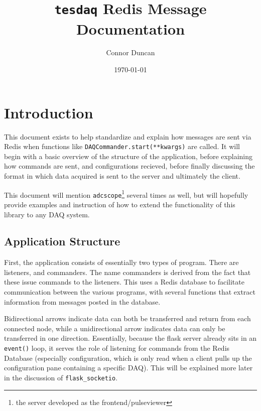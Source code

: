 \documentclass{article}
\author{Connor Duncan}
\date{\today}
\title{\texttt{tesdaq} Redis Message Documentation}
\begin{document}
\maketitle
\tableofcontents

\section{Introduction}
This document exists to help standardize and explain how messages are sent via Redis when functions like \texttt{DAQCommander.start(**kwargs)} are called. It will begin with a basic overview of the structure of the application, before explaining how commands are sent, and configurations recieved, before finally discussing the format in which data acquired is sent to the server and ultimately the client.

This document will mention \texttt{adcscope}\footnote{the server developed as the frontend/pulseviewer} several times as well, but will hopefully provide examples and instruction of how to extend the functionality of this library to any DAQ system.
\subsection{Application Structure}
First, the application consists of essentially two types of program. There are listeners, and commanders. The name commanders is derived from the fact that these issue commands to the listeners.
This uses a Redis database to facilitate communication between the various programs, with several functions that extract information from messages posted in the database.

\begin{center}
\end{center}
Bidirectional arrows indicate data can both be transferred and return from each connected node, while a unidirectional arrow indicates data can only be transferred in one direction. 
Essentially, because the flask server already sits in an \texttt{event()} loop, it serves the role of listening for commands from the Redis Database (especially configuration, which is only read when a client pulls up the configuration pane containing a specific DAQ). 
This will be explained more later in the discussion of \texttt{flask\_socketio}.
\end{document}
